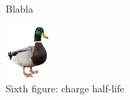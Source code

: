 \documentclass[9pt,lineno]{elife}
\begin{document}
\begin{figure}[ht!]
\centering
{}
\caption{
Blabla
}
\label{fig:Fig5}

\label{figsupp:f5S1}

\label{figsupp:f5S2}
\end{figure}




\begin{figure}[ht!]
\centering
\includegraphics[height=2cm]{figures/duck.jpg}
\caption{
Sixth figure: charge half-life
}
\label{fig:fig6}
\end{figure}
\end{document}
